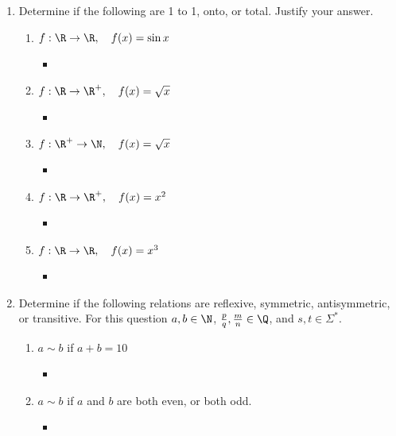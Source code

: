 \documentclass[basic, header]{nosvagor-notes}
\begin{document}
\begin{enumerate}[itemsep=5em]
  \item Determine if the following are 1 to 1, onto, or total. Justify your answer.
  \begin{enumerate}
    \item \(f : \R \to \R, \quad f(x) = \sin x\)
      \begin{itemize}
        \item
      \end{itemize}

    \item \(f : \R \to \R^+, \quad f(x) = \sqrt{x}\)
      \begin{itemize}
        \item
      \end{itemize}
    \item \(f : \R^+ \to \N, \quad f(x) = \sqrt{x}\)
      \begin{itemize}
        \item
      \end{itemize}
    \item \(f : \R \to \R^+, \quad f(x) = x^2\)
      \begin{itemize}
        \item
      \end{itemize}
    \item \(f : \R \to \R, \quad f(x) = x^3\)
      \begin{itemize}
        \item
      \end{itemize}

  \end{enumerate}

  \item Determine if the following relations are reflexive, symmetric,
    antisymmetric, or  transitive. For this question $a,b \in \N$, $\frac p
    q, \frac m n \in \Q$, and $s, t\in \Sigma^*$.
    \begin{enumerate}
      \item $a \sim b$ if $a + b = 10$
        \begin{itemize}
          \item
        \end{itemize}

      \item $a \sim b$ if $a$ and $b$ are both even, or both odd.
        \begin{itemize}
          \item
        \end{itemize}


\end{enumerate}
\end{enumerate}
\end{document}
